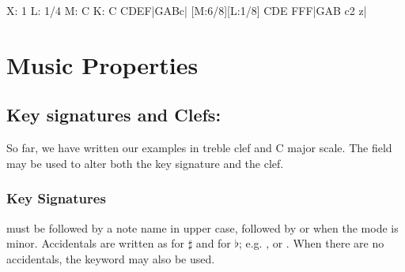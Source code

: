 \documentclass[a4paper,12pt]{book}
\begin{document}
\begin{abcsource}
X: 1
L: 1/4
M: C
K: C
CDEF|GABc| [M:6/8][L:1/8] CDE FFF|GAB c2 z|
\end{abcsource}












\section{Music Properties}

\subsection{Key signatures and Clefs: }
\label{sec:clefs}

So far, we have written our examples in treble clef and C major scale.
The  field may be used to alter both the key signature and
the clef.


\subsubsection{Key Signatures}

 must be followed by a note name in upper case, followed by
 or  when the mode is minor. Accidentals are written as
\car{\#} for $\sharp$ and  for $\flat$; e.g. , or
. When there are no accidentals, the keyword 
may also be used.
\end{document}
